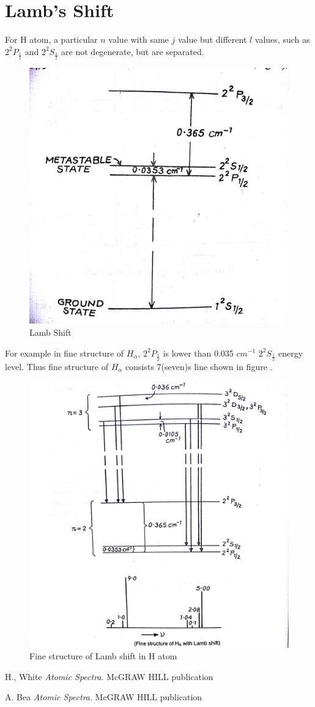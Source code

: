 \documentclass[a4paper]{article}
\begin{document}
\section{Lamb's Shift}

For H atom, a particular $n$ value with same $j$ value but different $l$ values, such as $2^2P_\frac{1}{2}$ and $2^2S_\frac{1}{2}$ are not degenerate, but are separated.\\
\begin{figure}
    \centering
    \includegraphics[width=.4\textwidth]{lamb2.jpg}
    \caption{Lamb Shift}
    \label{fig:fig2}
\end{figure}
For example in fine structure of $H_\alpha$,  $2^2P_\frac{1}{2}$ is lower than 0.035 $cm^{-1}$  $2^2S_\frac{1}{2}$ energy level. Thus fine structure of $H_\alpha$ consists 7(seven)s
line shown in figure .

\begin{figure}
    \centering
    \includegraphics[width=.5\textwidth]{lamb3.jpg}
    \caption{Fine structure of Lamb shift in H atom}
    \label{fig:fig3}
\end{figure}












\begin{thebibliography}{9}
  H., White
  \emph{Atomic Spectra}.
 McGRAW HILL publication

\end{thebibliography}
\begin{thebibliography}{9}
  A. Bea
  \emph{Atomic Spectra}.
 McGRAW HILL publication

\end{thebibliography}
\end{document}
